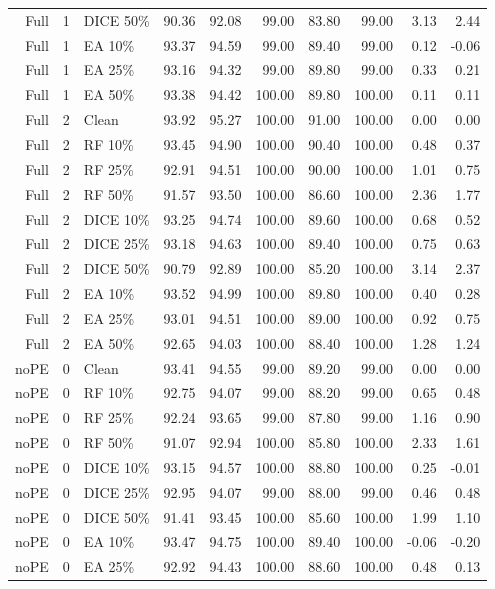 {\begin{longtable}{rllrrrrrrr}
Full & 1 & DICE 50\% & 90.36 & 92.08 & 99.00 & 83.80 & 99.00 & 3.13 & 2.44 \\
Full & 1 & EA 10\% & 93.37 & 94.59 & 99.00 & 89.40 & 99.00 & 0.12 & -0.06 \\
Full & 1 & EA 25\% & 93.16 & 94.32 & 99.00 & 89.80 & 99.00 & 0.33 & 0.21 \\
Full & 1 & EA 50\% & 93.38 & 94.42 & 100.00 & 89.80 & 100.00 & 0.11 & 0.11 \\
Full & 2 & Clean & 93.92 & 95.27 & 100.00 & 91.00 & 100.00 & 0.00 & 0.00 \\
Full & 2 & RF 10\% & 93.45 & 94.90 & 100.00 & 90.40 & 100.00 & 0.48 & 0.37 \\
Full & 2 & RF 25\% & 92.91 & 94.51 & 100.00 & 90.00 & 100.00 & 1.01 & 0.75 \\
Full & 2 & RF 50\% & 91.57 & 93.50 & 100.00 & 86.60 & 100.00 & 2.36 & 1.77 \\
Full & 2 & DICE 10\% & 93.25 & 94.74 & 100.00 & 89.60 & 100.00 & 0.68 & 0.52 \\
Full & 2 & DICE 25\% & 93.18 & 94.63 & 100.00 & 89.40 & 100.00 & 0.75 & 0.63 \\
Full & 2 & DICE 50\% & 90.79 & 92.89 & 100.00 & 85.20 & 100.00 & 3.14 & 2.37 \\
Full & 2 & EA 10\% & 93.52 & 94.99 & 100.00 & 89.80 & 100.00 & 0.40 & 0.28 \\
Full & 2 & EA 25\% & 93.01 & 94.51 & 100.00 & 89.00 & 100.00 & 0.92 & 0.75 \\
Full & 2 & EA 50\% & 92.65 & 94.03 & 100.00 & 88.40 & 100.00 & 1.28 & 1.24 \\
noPE & 0 & Clean & 93.41 & 94.55 & 99.00 & 89.20 & 99.00 & 0.00 & 0.00 \\
noPE & 0 & RF 10\% & 92.75 & 94.07 & 99.00 & 88.20 & 99.00 & 0.65 & 0.48 \\
noPE & 0 & RF 25\% & 92.24 & 93.65 & 99.00 & 87.80 & 99.00 & 1.16 & 0.90 \\
noPE & 0 & RF 50\% & 91.07 & 92.94 & 100.00 & 85.80 & 100.00 & 2.33 & 1.61 \\
noPE & 0 & DICE 10\% & 93.15 & 94.57 & 100.00 & 88.80 & 100.00 & 0.25 & -0.01 \\
noPE & 0 & DICE 25\% & 92.95 & 94.07 & 99.00 & 88.00 & 99.00 & 0.46 & 0.48 \\
noPE & 0 & DICE 50\% & 91.41 & 93.45 & 100.00 & 85.60 & 100.00 & 1.99 & 1.10 \\
noPE & 0 & EA 10\% & 93.47 & 94.75 & 100.00 & 89.40 & 100.00 & -0.06 & -0.20 \\
noPE & 0 & EA 25\% & 92.92 & 94.43 & 100.00 & 88.60 & 100.00 & 0.48 & 0.13 \\

\end{longtable}}

